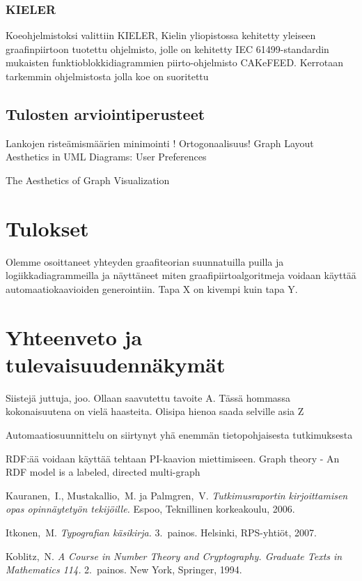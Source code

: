 \documentclass[finnish,12pt]{article}
\begin{document}
	\subsubsection{KIELER}

Koeohjelmistoksi valittiin KIELER, Kielin yliopistossa kehitetty yleiseen graafinpiirtoon tuotettu ohjelmisto, jolle on kehitetty IEC 61499-standardin mukaisten funktioblokkidiagrammien piirto-ohjelmisto CAKeFEED. 
Kerrotaan tarkemmin ohjelmistosta jolla koe on suoritettu

	\subsection{Tulosten arviointiperusteet}

Lankojen risteämismäärien minimointi !
Ortogonaalisuus!
Graph Layout Aesthetics in UML Diagrams: User Preferences

The Aesthetics of Graph Visualization

	\clearpage
	\section{Tulokset}
	
Olemme osoittaneet yhteyden graafiteorian suunnatuilla puilla ja logiikkadiagrammeilla ja näyttäneet miten graafipiirtoalgoritmeja voidaan käyttää automaatiokaavioiden generointiin.
Tapa X on kivempi kuin tapa Y.

	\section{Yhteenveto ja tulevaisuudennäkymät}
	
Siistejä juttuja, joo. Ollaan saavutettu tavoite A. Tässä hommassa kokonaisuutena on vielä haasteita. Olisipa hienoa saada selville asia Z

Automaatiosuunnittelu on siirtynyt yhä enemmän tietopohjaisesta tutkimuksesta

RDF:ää voidaan käyttää tehtaan PI-kaavion miettimiseen.
Graph theory - An RDF model is a labeled, directed multi-graph


\clearpage
{}

\begin{thebibliography}{99}
	 Kauranen,\ I., Mustakallio,\ M. ja Palmgren,\ V.
	  \textit{Tutkimusraportin kirjoittamisen opas opinnäytetyön
		tekijöille.}  Espoo, Teknillinen korkeakoulu, 2006.

	 Itkonen,\ M. \textit{Typografian käsikirja.} 3.\
	  painos.  Helsinki, RPS-yhtiöt, 2007.

	 Koblitz,\ N. \textit{A Course in Number Theory and
		Cryptography. Graduate Texts in Mathematics 114.}  2.\ painos. New
	  York, Springer, 1994.

	\end{thebibliography}
\end{document}
